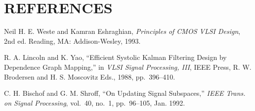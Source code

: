 \documentclass[aps,prb,twocolumn,superscriptaddress,floatfix,longbibliography]{revtex4-2}
\begin{document}

\section*{REFERENCES}


\begin{thebibliography}{99}

     Neil H. E. Weste and Kamran Eshraghian, {\it Principles
    of CMOS VLSI Design}, 2nd ed. Reading, MA: Addison-Wesley, 1993.
  
     R. A. Lincoln and K. Yao, ``Efficient Systolic Kalman
    Filtering Design by Dependence Graph Mapping,'' in {\it VLSI Signal
    Processing, III}, IEEE Press, R. W. Brodersen and H. S. Moscovitz Eds.,
    1988, pp.~396--410.
  
     C. H. Bischof and G. M. Shroff, ``On Updating Signal
    Subspaces,'' {\it IEEE Trans. on Signal Processing}, vol.~40, no.~1,
    pp.~96--105, Jan. 1992.
  
  \end{thebibliography}
  
\end{document}

